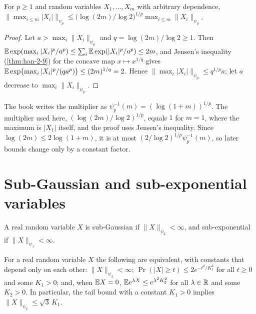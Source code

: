 \begin{lemma}
  \label{lem:han-2-3}
  For $p\ge1$ and random variables $X_1,\dots,X_m$ with arbitrary dependence,
  $\bigl\|\max_{i\le m}|X_i|\bigr\|_{\psi_p}\le\bigl(\log(2m)/\log2\bigr)^{1/p}\max_{i\le m}\|X_i\|_{\psi_p}$.
\end{lemma}
\begin{proof}
  Let $a>\max_i\|X_i\|_{\psi_p}$ and $q=\log(2m)/\log2\ge1$. Then $\mathbb{E}\exp(\max_i|X_i|^p/a^p)\le\sum_i\mathbb{E}\exp(|X_i|^p/a^p)\le2m$, and Jensen's inequality (\cref{thm:han-2-9}) for the concave map $x\mapsto x^{1/q}$ gives $\mathbb{E}\exp\bigl(\max_i|X_i|^p/(qa^p)\bigr)\le(2m)^{1/q}=2$. Hence $\|\max_i|X_i|\|_{\psi_p}\le q^{1/p}a$; let $a$ decrease to $\max_i\|X_i\|_{\psi_p}$.
\end{proof}
\begin{remark}
  The book writes the multiplier as $\psi_p^{-1}(m)=(\log(1+m))^{1/p}$. The multiplier used here, $(\log(2m)/\log2)^{1/p}$, equals $1$ for $m=1$, where the maximum is $|X_1|$ itself, and the proof uses Jensen's inequality. Since $\log(2m)\le2\log(1+m)$, it is at most $(2/\log2)^{1/p}\psi_p^{-1}(m)$, so later bounds change only by a constant factor.
\end{remark}

\section{Sub-Gaussian and sub-exponential variables}

\begin{definition}
  \label{def:han-2-11}
  A real random variable $X$ is sub-Gaussian if $\|X\|_{\psi_2}<\infty$, and sub-exponential if $\|X\|_{\psi_1}<\infty$.
\end{definition}

\begin{lemma}
  \label{lem:han-2-2-i}
  For a real random variable $X$ the following are equivalent, with constants that depend only on each other: $\|X\|_{\psi_2}<\infty$; $\Pr(|X|\ge t)\le2e^{-t^2/K_1^2}$ for all $t\ge0$ and some $K_1>0$; and, when $\mathbb{E} X=0$, $\mathbb{E} e^{\lambda X}\le e^{\lambda^2K_2^2}$ for all $\lambda\in\mathbb{R}$ and some $K_2>0$. In particular, the tail bound with a constant $K_1>0$ implies $\|X\|_{\psi_2}\le\sqrt3\,K_1$.
\end{lemma}

